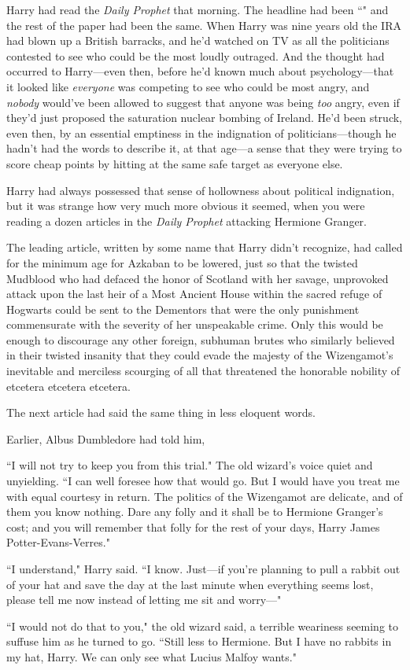 Harry had read the \emph{Daily Prophet} that morning. The headline had been ``" and the rest of the paper had been the same. When Harry was nine years old the IRA had blown up a British barracks, and he'd watched on TV as all the politicians contested to see who could be the most loudly outraged. And the thought had occurred to Harry—even then, before he'd known much about psychology—that it looked like \emph{everyone} was competing to see who could be most angry, and \emph{nobody} would've been allowed to suggest that anyone was being \emph{too} angry, even if they'd just proposed the saturation nuclear bombing of Ireland. He'd been struck, even then, by an essential emptiness in the indignation of politicians—though he hadn't had the words to describe it, at that age—a sense that they were trying to score cheap points by hitting at the same safe target as everyone else.

Harry had always possessed that sense of hollowness about political indignation, but it was strange how very much more obvious it seemed, when you were reading a dozen articles in the \emph{Daily Prophet} attacking Hermione Granger.

The leading article, written by some name that Harry didn't recognize, had called for the minimum age for Azkaban to be lowered, just so that the twisted Mudblood who had defaced the honor of Scotland with her savage, unprovoked attack upon the last heir of a Most Ancient House within the sacred refuge of Hogwarts could be sent to the Dementors that were the only punishment commensurate with the severity of her unspeakable crime. Only this would be enough to discourage any other foreign, subhuman brutes who similarly believed in their twisted insanity that they could evade the majesty of the Wizengamot's inevitable and merciless scourging of all that threatened the honorable nobility of etcetera etcetera etcetera.

The next article had said the same thing in less eloquent words.

Earlier, Albus Dumbledore had told him,

\begin{em}
``I will not try to keep you from this trial." The old wizard's voice quiet and unyielding. ``I can well foresee how that would go. But I would have you treat me with equal courtesy in return. The politics of the Wizengamot are delicate, and of them you know nothing. Dare any folly and it shall be to Hermione Granger's cost; and you will remember that folly for the rest of your days, Harry James Potter-Evans-Verres."

``I understand," Harry said. ``I know. Just—if you're planning to pull a rabbit out of your hat and save the day at the last minute when everything seems lost, please tell me now instead of letting me sit and worry—"

``I would not do that to you," the old wizard said, a terrible weariness seeming to suffuse him as he turned to go. ``Still less to Hermione. But I have no rabbits in my hat, Harry. We can only see what Lucius Malfoy wants."
\end{em}

